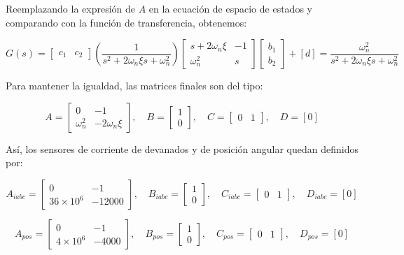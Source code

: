 \documentclass{article}
\begin{document}
Reemplazando la expresi\'on de $A$ en la ecuaci\'on de espacio de estados y comparando con la funci\'on de transferencia, obtenemos:

\begin{equation}
    G(s) = \begin{bmatrix} c_1 & c_2 \end{bmatrix}
    \left( \frac{1}{s^2 + 2 \omega_n \xi s + \omega_n^2} \right)
    \begin{bmatrix}
        s + 2 \omega_n \xi & -1 \\
        \omega_n^2 & s
    \end{bmatrix}
    \begin{bmatrix} b_1 \\ b_2 \end{bmatrix} + [d] = \frac{\omega_n^2}{s^2 + 2 \omega_n \xi s + \omega_n^2}
\end{equation}

Para mantener la igualdad, las matrices finales son del tipo:

\begin{equation}
    A = \begin{bmatrix}
        0 & -1 \\
        \omega_n^2 & -2 \omega_n \xi
    \end{bmatrix}, \quad B = \begin{bmatrix} 1 \\ 0 \end{bmatrix}, \quad C = \begin{bmatrix} 0 & 1 \end{bmatrix}, \quad D = [0]
\end{equation}

Así, los sensores de corriente de devanados y de posici\'on angular quedan definidos por:

\begin{equation}
    A_{iabc} = \begin{bmatrix}
        0 & -1 \\
        36 \times 10^6 & -12000
    \end{bmatrix}, \quad B_{iabc} = \begin{bmatrix} 1 \\ 0 \end{bmatrix}, \quad C_{iabc} = \begin{bmatrix} 0 & 1 \end{bmatrix}, \quad D_{iabc} = [0]
\end{equation}

\begin{equation}
    A_{pos} = \begin{bmatrix}
        0 & -1 \\
        4 \times 10^6 & -4000
    \end{bmatrix}, \quad B_{pos} = \begin{bmatrix} 1 \\ 0 \end{bmatrix}, \quad C_{pos} = \begin{bmatrix} 0 & 1 \end{bmatrix}, \quad D_{pos} = [0]
\end{equation}
\end{document}
